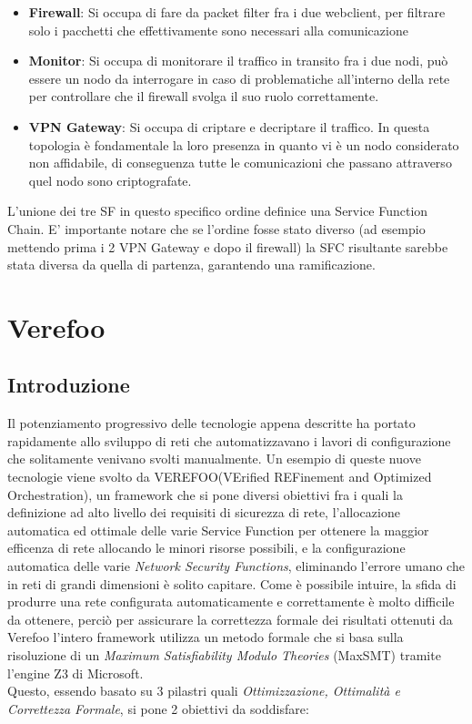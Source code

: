 \begin{itemize}
    \item \textbf{Firewall}: Si occupa di fare da packet filter fra i due webclient, per filtrare solo i pacchetti che effettivamente sono necessari alla comunicazione
    \item \textbf{Monitor}: Si occupa di monitorare il traffico in transito fra i due nodi, può essere un nodo da interrogare in caso di problematiche all'interno della rete per controllare che il firewall svolga il suo ruolo correttamente.
    \item \textbf{VPN Gateway}: Si occupa di criptare e decriptare il traffico. In questa topologia è fondamentale la loro presenza in quanto vi è un nodo considerato non affidabile, di conseguenza tutte le comunicazioni che passano attraverso quel nodo sono criptografate.
\end{itemize}

L'unione dei tre SF in questo specifico ordine definice una Service Function Chain. E' importante notare che se l'ordine fosse stato diverso (ad esempio mettendo prima i 2 VPN Gateway e dopo il firewall)
la SFC risultante sarebbe stata diversa da quella di partenza, garantendo una ramificazione.

\section{Verefoo}
\subsection{Introduzione}
 Il potenziamento progressivo delle tecnologie appena descritte ha portato rapidamente allo sviluppo di reti  che automatizzavano i lavori di configurazione che solitamente venivano svolti manualmente.
 Un esempio di queste nuove tecnologie viene svolto da VEREFOO\cite{Bringhenti2019}(VErified REFinement and Optimized Orchestration), un framework che si pone diversi obiettivi fra i quali la definizione
ad alto livello dei requisiti di sicurezza di rete, l'allocazione automatica ed ottimale delle varie Service Function per ottenere la maggior efficenza di rete allocando le minori risorse possibili, e la
configurazione automatica delle varie \textit{Network Security Functions}, eliminando l'errore  umano che in reti di grandi dimensioni è solito capitare\cite{cit8}.
Come è possibile intuire, la sfida di produrre una rete configurata automaticamente e correttamente è molto difficile da ottenere, perciò per assicurare la correttezza formale dei risultati ottenuti da Verefoo
l'intero framework utilizza un metodo formale che si basa sulla risoluzione di un \textit{Maximum Satisfiability Modulo Theories} (MaxSMT) tramite l'engine Z3 di Microsoft.\\
Questo, essendo basato su 3 pilastri quali \textit{Ottimizzazione, Ottimalità e Correttezza Formale}, si pone 2 obiettivi da soddisfare:

